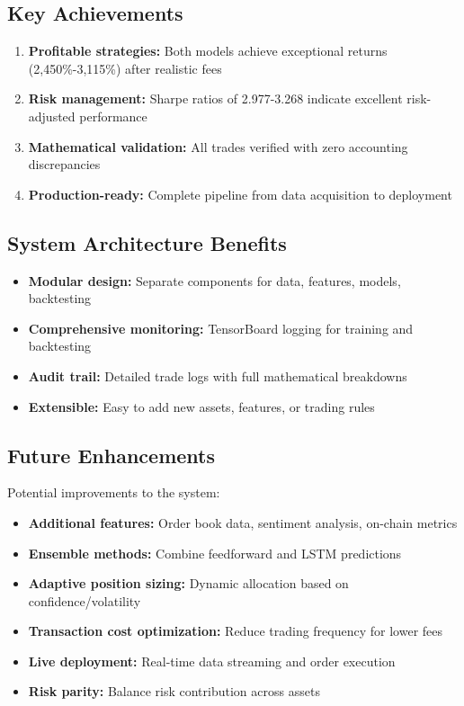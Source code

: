 \documentclass[12pt,a4paper]{article}
\begin{document}
\subsection{Key Achievements}
\begin{enumerate}
    \item \textbf{Profitable strategies:} Both models achieve exceptional returns (2,450\%-3,115\%) after realistic fees
    \item \textbf{Risk management:} Sharpe ratios of 2.977-3.268 indicate excellent risk-adjusted performance
    \item \textbf{Mathematical validation:} All trades verified with zero accounting discrepancies
    \item \textbf{Production-ready:} Complete pipeline from data acquisition to deployment
\end{enumerate}

\subsection{System Architecture Benefits}
\begin{itemize}
    \item \textbf{Modular design:} Separate components for data, features, models, backtesting
    \item \textbf{Comprehensive monitoring:} TensorBoard logging for training and backtesting
    \item \textbf{Audit trail:} Detailed trade logs with full mathematical breakdowns
    \item \textbf{Extensible:} Easy to add new assets, features, or trading rules
\end{itemize}

\subsection{Future Enhancements}
Potential improvements to the system:
\begin{itemize}
    \item \textbf{Additional features:} Order book data, sentiment analysis, on-chain metrics
    \item \textbf{Ensemble methods:} Combine feedforward and LSTM predictions
    \item \textbf{Adaptive position sizing:} Dynamic allocation based on confidence/volatility
    \item \textbf{Transaction cost optimization:} Reduce trading frequency for lower fees
    \item \textbf{Live deployment:} Real-time data streaming and order execution
    \item \textbf{Risk parity:} Balance risk contribution across assets
\end{itemize}
\end{document}
